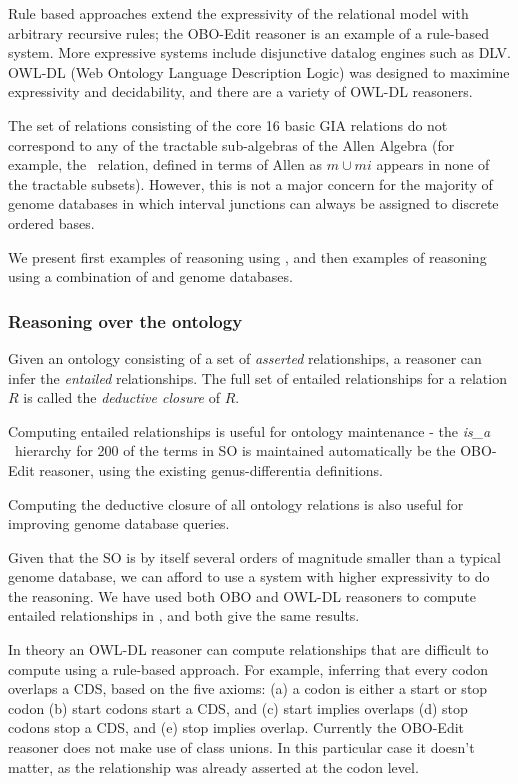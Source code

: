 \documentclass{article}
\newcommand{\tr}[1]{\textit{#1} }
\def\isA{\tr{is\_a}}
\def\adjacentTo{\pr{adjacent\_to}}
\def\SOGI{\pr{SO$^{+}$}}
\begin{document}
Rule based approaches extend the expressivity of the relational model
with arbitrary recursive rules; the OBO-Edit reasoner is an example of
a rule-based system. More expressive systems include disjunctive
datalog engines such as DLV. OWL-DL (Web Ontology Language Description
Logic) was designed to maximine expressivity and decidability, and
there are a variety of OWL-DL reasoners.

The set of relations consisting of the core 16 basic GIA relations do
not correspond to any of the tractable sub-algebras of the Allen
Algebra (for example, the \adjacentTo\ relation, defined in terms of
Allen as $m \cup mi$ appears in none of the tractable
subsets). However, this is not a major concern for the majority of
genome databases in which interval junctions can always be assigned to
discrete ordered bases.

We present first examples of reasoning using \SOGI, and then examples
of reasoning using a combination of \SOGI and genome databases.

\subsubsection{Reasoning over the ontology}

Given an ontology consisting of a set of \emph{asserted}
relationships, a reasoner can infer the \emph{entailed}
relationships. The full set of entailed relationships for a relation
$R$ is called the \emph{deductive closure} of $R$.

Computing entailed relationships is useful for ontology maintenance -
the \isA\ hierarchy for 200 of the terms in SO is maintained
automatically be the OBO-Edit reasoner, using the existing
genus-differentia definitions.

Computing the deductive closure of all ontology relations is also
useful for improving genome database queries.

Given that the SO is by itself several orders of magnitude smaller
than a typical genome database, we can afford to use a system with
higher expressivity to do the reasoning. We have used both OBO and
OWL-DL reasoners to compute entailed relationships in \SOGI, and both
give the same results.

In theory an OWL-DL reasoner can compute relationships that are
difficult to compute using a rule-based approach. For example,
inferring that every codon overlaps a CDS, based on the five axioms:
(a) a codon is either a start or stop codon (b) start codons start a
CDS, and (c) start implies overlaps (d) stop codons stop a CDS, and
(e) stop implies overlap. Currently the OBO-Edit reasoner does not
make use of class unions. In this particular case it doesn't matter,
as the relationship was already asserted at the codon level.
\end{document}
